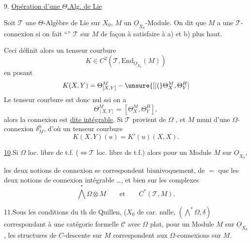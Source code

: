 
9.\quad {} \uline{Opération d'une $\Theta$.Alg. de Lie}

Soit $\mathscr T$ une $\Theta$-Algèbre de Lie sur $X_0$, $M$ un $\underline O_{X_0}$-Module. On dit que  $M$ a une $\mathscr T$-connexion si on fait ``'' $\mathscr T$ sur $M$ de façon à satisfaire à a) et b) plus haut.

Ceci définit alors un tenseur courbure
\[
K\in C^2(\mathscr T,\mathrm{End}_{\underline O_{X_0}}(M))
\]
en posant
\[
K(X,Y)=\Theta_{[X,Y]}^M-\unsure{[|(}\Theta_X^M,\Theta_Y^H]
\]
Le tenseur courbure est donc nul ssi on a
\[
\Theta_{[X,Y]}^M=[\Theta_X^M,\Theta_Y^H],
\]
alors la connexion est \uline{dite intégrable}. Si $\mathscr T$ provient de $\Omega$ , et $M$  muni d'une $\Omega$-connexion $\delta_M^0$, d'où un tenseur courbure
\[
K(X,Y)(u)=K'(u)(X,X).
\]

\uline{10}.\quad Si  $\Omega$ loc. libre de t.f. ($\Longleftrightarrow\mathscr T$  loc. libre de t.f.) alors pour un Module $M$ sur $\underline O_{X_0}$,


les deux notions de connexion se correspondent biunivoquement, de $=$ que les deux notions de  connexion intégrable \ldots, et bien sur les complexes
\[
\bigwedge^*\Omega\otimes M\qquad\text{et}\qquad C^*(\mathscr T,M).
\]

11.\quad Sous les conditions du th de Quillen, ($X_0$ de car. nulle,  $(\bigwedge^*\Omega,\delta)$  correspondant à une catégorie formelle $\mathcal C$ avec $\Omega$ plat, pour un Module $M$ sur $\underline O_{X_0}$, les structures de $C$-descente sur $M$ correspondent aux  $\Omega$-connexions sur $M$.

